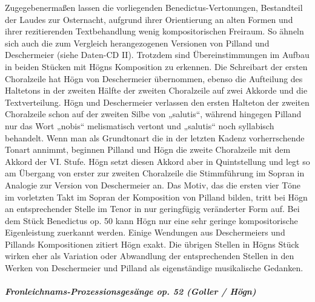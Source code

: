 Zugegebenermaßen lassen die vorliegenden Benedictus-Vertonungen,
Bestandteil der Laudes zur Osternacht, aufgrund ihrer Orientierung an
alten Formen und ihrer rezitierenden Textbehandlung wenig
kompositorischen Freiraum. So ähneln sich auch die zum Vergleich
herangezogenen Versionen von Pilland und Deschermeier (siehe Daten-CD
II). Trotzdem sind Übereinstimmungen im Aufbau in beiden Stücken mit
Högns Komposition zu erkennen. Die Schreibart der ersten Choralzeile
hat Högn von Deschermeier übernommen, ebenso die Aufteilung des
Haltetons in der zweiten Hälfte der zweiten Choralzeile auf zwei
Akkorde und die Textverteilung. Högn und Deschermeier verlassen den
ersten Halteton der zweiten Choralzeile schon auf der zweiten Silbe von
„salutis“, während hingegen Pilland nur das Wort „nobis“ melismatisch
vertont und „salutis“ noch syllabisch behandelt. Wenn man als
Grundtonart die in der letzten Kadenz vorherrschende Tonart annimmt,
beginnen Pilland und Högn die zweite Choralzeile mit dem Akkord der VI.
Stufe. Högn setzt diesen Akkord aber in Quintstellung und legt so am
Übergang von erster zur zweiten Choralzeile die Stimmführung im Sopran
in Analogie zur Version von Deschermeier an. Das Motiv, das die ersten
vier Töne im vorletzten Takt im Sopran der Komposition von Pilland
bilden, tritt bei Högn an entsprechender Stelle im Tenor in nur
geringfügig veränderter Form auf. Bei dem Stück Benedictus op. 50 kann
Högn nur eine sehr geringe kompositorische Eigenleistung zuerkannt
werden. Einige Wendungen aus Deschermeiers und Pillands Kompositionen
zitiert Högn exakt. Die übrigen Stellen in Högns Stück wirken eher als
Variation oder Abwandlung der entsprechenden Stellen in den Werken von
Deschermeier und Pilland als eigenständige musikalische Gedanken.

\subparagraph{Fronleichnams-Prozessionsgesänge op. 52 (Goller / Högn)}

